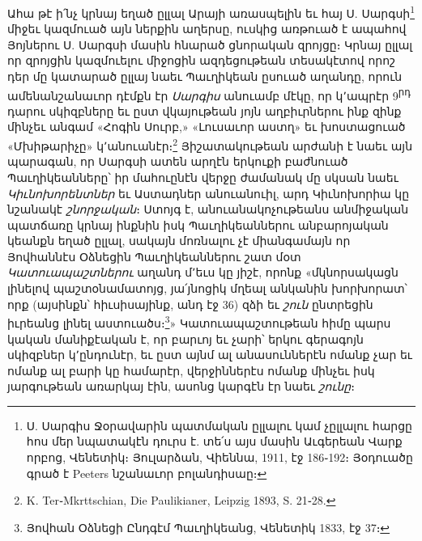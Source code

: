 \documentclass{article}
\begin{document}
{Ահա թէ ի՛նչ կրնայ եղած ըլլալ Արայի առասպելին եւ հայ Ս. Սարգսի\footnote{Ս. Սարգիս Ջօրավարին պատմական ըլլալու կամ չըլլալու հարցը հոս մեր նպատակէն դուրս է. տե՛ս այս մասին Աւգերեան Վարք որբոց, Վենետիկ։ Յուլարձան, Վիեննա, 1911, էջ 186֊192։ Յօդուածը գրած է Peeters նշանաւոր բոլանդիսաը։} միջեւ կազմուած այն ներքին աղերսը, ուսկից առթուած է ապահով Յոյներու Ս. Սարգսի մասին հնարած ցնորական զրոյցը։ Կրնայ ըլլալ որ զրոյցին կազմուելու միջոցին ազդեցութեան տեսակէտով որոշ դեր մը կատարած ըլլայ նաեւ Պաւղիկեան ըսուած աղանդը, որուն ամենանշանաւոր դէմքն էր \emph{Սարգիս} անուամբ մէկը, որ կ՚ապրէր 9\textsuperscript{րդ} դարու սկիզբները եւ ըստ վկայութեան յոյն աղբիւրներու ինք զինք մինչեւ անգամ «Հոգին Սուրբ,» «Լուսաւոր աստղ» եւ խոստացուած «Մխիթարիչը» կ՚անուանէր։\footnote{K. Ter֊Mkrttschian, Die Paulikianer, Leipzig 1893, S. 21֊28.} Յիշատակութեան արժանի է նաեւ այն պարագան, որ Սարգսի ատեն արղէն երկուքի բաժնուած Պաւղիկեանները՝ իր մահուընէն վերջը ժամանակ մը սկսան նաեւ \emph{Կիւնոխորենտներ} եւ Աստադներ անուանուիլ, արդ Կիւնոխորիա կը նշանակէ \emph{շնորջական}։ Ստոյգ է, անուանակոչութեանս անմիջական պատճառը կրնայ ինքնին իսկ Պաւղիկեաններու անբարոյական կեանքն եղած ըլլալ, սակայն մոռնալու չէ միանգամայն որ Յովհաննէս Օձնեցին Պաւղիկեաններու շատ մօտ \emph{Կատուապաշտներու} աղանդ մ՚եւս կը յիշէ, որոնք «մկնորսակացն լինելով պաշտօնամատոյց, յա՛յնոցիկ մղեալ անկանին խորխորատ՝ որք (այսինքն՝ հիւսիսայինք, անդ էջ 36) զձի եւ \emph{շուն} ընտրեցին իւրեանց լինել աստուածս։\footnote{Յովհան Օձնեցի Ընդգէմ Պաւղիկեանց, Վենետիկ 1833, էջ 37։}» Կատուապաշտութեան հիմը պարս կական մանիքէական է, որ բարւոյ եւ չարի՝ երկու գերագոյն սկիզբներ կ՚ընդունէր, եւ ըստ այնմ ալ անասուններէն ոմանք չար եւ ոմանք ալ բարի կը համարէր, վերջիններէս ոմանք մինչեւ իսկ յարգութեան առարկայ էին, ասոնց կարգէն էր նաեւ \emph{շունը}։

}
\end{document}
